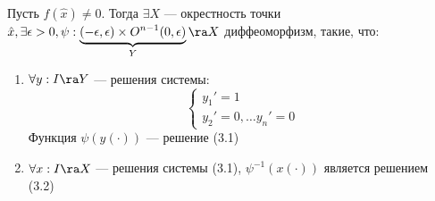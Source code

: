 \begin{theorem}
    Пусть \(f(\hat{x}) \ne 0\). Тогда \(\exists X\) --- окрестность точки \(\hat{x}, \exists \epsilon > 0, \psi: \underbrace{(-\epsilon, \epsilon) \times O^{n - 1}(0, \epsilon)}_Y \ra X\) диффеоморфизм, такие, что:
    \begin{enumerate}
        \item \(\forall y: I \ra Y\) --- решения системы:
        \begin{equation}
            \begin{cases}
                y_1' = 1 \\
                y_2' = 0, \dots y_n' = 0
            \end{cases}
        \end{equation}
        Функция \(\psi(y(\cdot))\) --- решение (3.1)
        \item \(\forall x: I \ra X\) --- решения системы (3.1), \(\psi^{-1}(x(\cdot))\) является решением (3.2)
    \end{enumerate}
\end{theorem}
